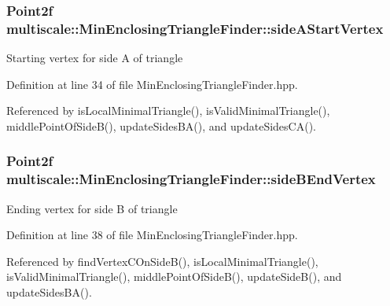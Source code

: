 \hypertarget{classmultiscale_1_1MinEnclosingTriangleFinder_a2e9e3f20e0c0d8bcf34e8ce903aabb42}{
\subsubsection[{side\-A\-Start\-Vertex}]{\setlength{\rightskip}{0pt plus 5cm}Point2f multiscale\-::\-Min\-Enclosing\-Triangle\-Finder\-::side\-A\-Start\-Vertex\hspace{0.3cm}{\ttfamily [private]}}}\label{classmultiscale_1_1MinEnclosingTriangleFinder_a2e9e3f20e0c0d8bcf34e8ce903aabb42}
Starting vertex for side A of triangle 

Definition at line 34 of file Min\-Enclosing\-Triangle\-Finder.\-hpp.



Referenced by is\-Local\-Minimal\-Triangle(), is\-Valid\-Minimal\-Triangle(), middle\-Point\-Of\-Side\-B(), update\-Sides\-B\-A(), and update\-Sides\-C\-A().

\hypertarget{classmultiscale_1_1MinEnclosingTriangleFinder_a8e3929795823c49572ff65a4f04462c6}{
\subsubsection[{side\-B\-End\-Vertex}]{\setlength{\rightskip}{0pt plus 5cm}Point2f multiscale\-::\-Min\-Enclosing\-Triangle\-Finder\-::side\-B\-End\-Vertex\hspace{0.3cm}{\ttfamily [private]}}}\label{classmultiscale_1_1MinEnclosingTriangleFinder_a8e3929795823c49572ff65a4f04462c6}
Ending vertex for side B of triangle 

Definition at line 38 of file Min\-Enclosing\-Triangle\-Finder.\-hpp.



Referenced by find\-Vertex\-C\-On\-Side\-B(), is\-Local\-Minimal\-Triangle(), is\-Valid\-Minimal\-Triangle(), middle\-Point\-Of\-Side\-B(), update\-Side\-B(), and update\-Sides\-B\-A().

